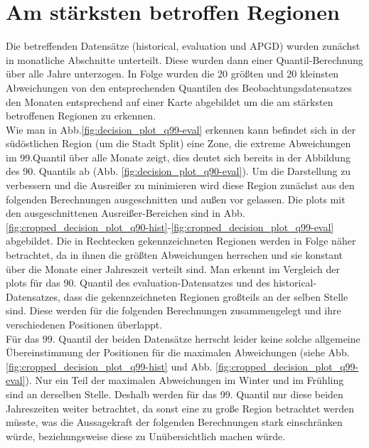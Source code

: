 \section{Am stärksten betroffen Regionen}
Die betreffenden Datensätze (historical, evaluation und APGD) wurden zunächst in monatliche Abschnitte unterteilt. Diese wurden dann einer Quantil-Berechnung über alle Jahre unterzogen. In Folge wurden die 20 größten und 20 kleinsten Abweichungen von den entsprechenden Quantilen des Beobachtungsdatensatzes den Monaten entsprechend auf einer Karte abgebildet um die am stärksten betroffenen Regionen zu erkennen.\\
Wie man in Abb.\ref{fig:decision_plot_q99-eval} erkennen kann befindet sich in der südöstlichen Region (um die Stadt Split) eine Zone, die extreme Abweichungen im 99.Quantil über alle Monate zeigt, dies deutet sich bereits in der Abbildung des 90. Quantils ab (Abb. \ref{fig:decision_plot_q90-eval}). Um die Darstellung zu verbessern und die Ausreißer zu minimieren wird diese Region zunächst aus den folgenden Berechnungen ausgeschnitten und außen vor gelassen. Die plots mit den ausgeschnittenen Ausreißer-Bereichen sind in Abb. \ref{fig:cropped_decision_plot_q90-hist}-\ref{fig:cropped_decision_plot_q99-eval} abgebildet. Die in Rechtecken gekennzeichneten Regionen werden in Folge näher betrachtet, da in ihnen die größten Abweichungen herrschen und sie konstant über die Monate einer Jahreszeit verteilt sind. Man erkennt im Vergleich der plots für das 90. Quantil des evaluation-Datensatzes und des historical-Datensatzes, dass die gekennzeichneten Regionen großteils an der selben Stelle sind. Diese werden für die folgenden Berechnungen zusammengelegt und ihre verschiedenen Positionen überlappt.\\
Für das 99. Quantil der beiden Datensätze herrscht leider keine solche allgemeine Übereinstimmung der Positionen für die maximalen Abweichungen (siehe Abb. \ref{fig:cropped_decision_plot_q99-hist} und Abb. \ref{fig:cropped_decision_plot_q99-eval}). Nur ein Teil der maximalen Abweichungen im Winter und im Frühling sind an derselben Stelle. Deshalb werden für das 99. Quantil nur diese beiden Jahreszeiten weiter betrachtet, da sonst eine zu große Region betrachtet werden müsste, was die Aussagekraft der folgenden Berechnungen stark einschränken würde, beziehungsweise diese zu Unübersichtlich machen würde.


